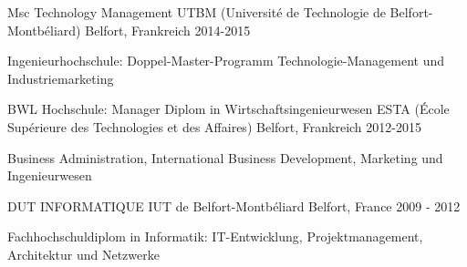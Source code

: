 

\begin{cventries}

  \cventry
    {Msc Technology Management} %
    {UTBM (Université de Technologie de Belfort-Montbéliard)} %
    {Belfort, Frankreich} %
    {2014-2015} %
    {
      \begin{cvitems} %
        \item {Ingenieurhochschule: Doppel-Master-Programm Technologie-Management und Industriemarketing}
      \end{cvitems}
    }
    
  \cventry
    {BWL Hochschule: Manager Diplom in Wirtschaftsingenieurwesen} %
    {ESTA (École Supérieure des Technologies et des Affaires)} %
    {Belfort, Frankreich} %
    {2012-2015} %
    {
      \begin{cvitems} %
        \item {Business Administration, International Business Development, Marketing und Ingenieurwesen}
      \end{cvitems}
    }

  \cventry
    {DUT INFORMATIQUE} %
    {IUT de Belfort-Montbéliard} %
    {Belfort, France} %
    {2009 - 2012} %
    {
      \begin{cvitems} %
        \item {Fachhochschuldiplom in Informatik: IT-Entwicklung, 
        	Projektmanagement, Architektur und Netzwerke}
      \end{cvitems}
    }


\end{cventries}
